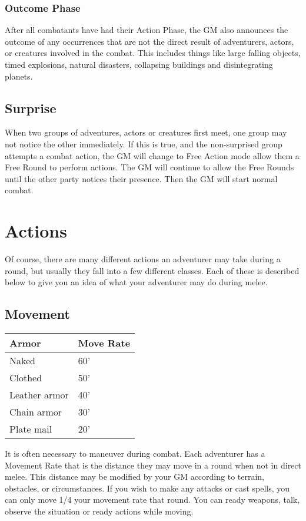 \subsubsection{Outcome Phase}
After all combatants have had their Action Phase, the GM also announces the outcome of any occurrences that are not the direct result of adventurers, actors, or creatures involved in the combat. This includes things like large falling objects, timed explosions, natural disasters, collapsing buildings and disintegrating planets.
\subsection{Surprise}
When two groups of adventures, actors or creatures first meet, one group may not notice the other immediately. If this is true, and the non-surprised group attempts a combat
action, the GM will change to Free Action mode allow them a Free Round to perform actions. The GM will continue to allow the Free Rounds until the other party notices their presence. Then the GM will start normal combat.
\section{Actions}
Of course, there are many different actions an adventurer may take during a round, but usually they fall into a few different classes. Each of these is described below to give you an idea of what your adventurer may do during melee.
\subsection{Movement}
\begin{normbox}
\small
\begin{tabular}{@{}l l}
Armor & Move Rate\\
\midrule
Naked & 60'\\
Clothed & 50'\\
Leather armor & 40'\\
Chain armor & 30'\\
Plate mail & 20'\\
\end{tabular}
\end{normbox}

It is often necessary to maneuver during combat. Each adventurer has a Movement Rate that is the distance they may move in a round when not in direct melee. This distance may be modified by your GM according to terrain, obstacles, or circumstances. If you wish to make any attacks or cast spells, you can only move 1/4 your movement rate that round. You can ready weapons, talk, observe the situation or ready actions while moving.

